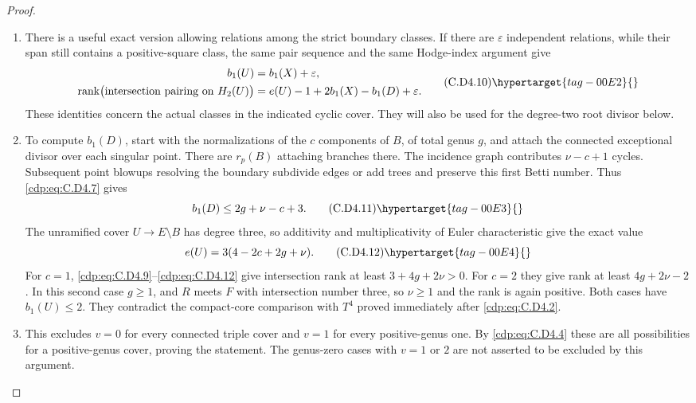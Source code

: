 \begin{proof}
\begin{enumerate}[label={$\langle1\rangle$\arabic*.},leftmargin=*]
\item There is a useful exact version allowing relations among
the strict boundary classes. If there are $\varepsilon$
independent relations, while their span still contains a
positive-square class, the same pair sequence and the same
Hodge-index argument give
\[
\begin{split}
 b_1(U)&=b_1(X)+\varepsilon,\\
 \operatorname{rank}\bigl(\hbox{intersection pairing on }H_2(U)\bigr)
 &=e(U)-1+2b_1(X)-b_1(D)+\varepsilon.
\end{split}
\tag{C.D4.10}\hypertarget{tag-00E2}{}\label{cdp:eq:C.D4.10}
\]
These identities concern the actual classes in the indicated
cyclic cover. They will also be used for the degree-two
root divisor below.

\item To compute $b_1(D)$, start with the normalizations of the
$c$ components of $B$, of total genus $g$, and attach the
connected exceptional divisor over each singular point.
There are $r_p(B)$ attaching branches there. The incidence
graph contributes $\nu-c+1$ cycles. Subsequent point
blowups resolving the boundary subdivide edges or add trees
and preserve this first Betti number. Thus \eqref{cdp:eq:C.D4.7} gives
\[
                         b_1(D)\le2g+\nu-c+3.
\tag{C.D4.11}\hypertarget{tag-00E3}{}\label{cdp:eq:C.D4.11}
\]
The unramified cover $U\to E\setminus B$ has degree three,
so additivity and multiplicativity of Euler characteristic
give the exact value
\[
                         e(U)=3(4-2c+2g+\nu).
\tag{C.D4.12}\hypertarget{tag-00E4}{}\label{cdp:eq:C.D4.12}
\]
For $c=1$, \eqref{cdp:eq:C.D4.9}--\eqref{cdp:eq:C.D4.12} give intersection rank at
least $3+4g+2\nu>0$. For $c=2$ they give rank at least
$4g+2\nu-2$. In this second case $g\ge1$, and $R$ meets
$F$ with intersection number three, so $\nu\ge1$ and the
rank is again positive. Both cases have $b_1(U)\le2$.
They contradict the compact-core comparison with $T^4$
proved immediately after \eqref{cdp:eq:C.D4.2}.

\item This excludes $v=0$ for every connected triple cover and
$v=1$ for every positive-genus one. By \eqref{cdp:eq:C.D4.4} these are
all possibilities for a positive-genus cover, proving the
statement. The genus-zero cases with $v=1$ or $2$ are not
asserted to be excluded by this argument.

\end{enumerate}
\end{proof}
